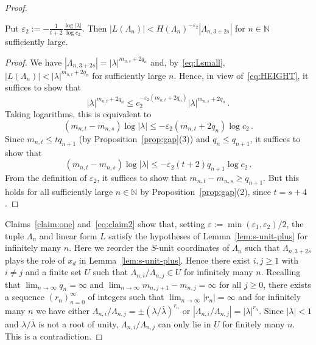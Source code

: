 \documentclass[a4paper,UKenglish,cleveref, autoref, thm-restate]{lipics-v2021}
\begin{document}
\begin{proof}
\begin{claim}
Put $\varepsilon_2:=-\frac{1}{t+2}\frac{\log|\lambda|}{\log c_2}$.  
Then $|L(\Lambda_n)| < H(\Lambda_n)^{-\varepsilon_2} |\Lambda_{n,3+2s}|$ for $n \in \mathbb N$ sufficiently large.
    \label{eq:claim2}
\end{claim}
\begin{proof}
We have $|\Lambda_{n,3+2s}|=|\lambda|^{m_{n,s}+2q_n}$ and,
by~\eqref{eq:Lsmall}, $|L(\Lambda_n)| < |\lambda|^{m_{n,t}+2q_n}$ for sufficiently large $n$.
Hence, in view of~\eqref{eq:HEIGHT}, it suffices to show that 
\[|\lambda|^{m_{n,t}+2q_n} \leq c_2^{-\varepsilon_2(m_{n,t}+2q_n)} |\lambda|^{m_{n,s}+2q_n}\, .\]
Taking logarithms, this is equivalent to 
\[
(m_{n,t}-m_{n,s}) \log |\lambda| \leq - \varepsilon_2 (m_{n,t}+2q_n) \log c_2 \, .
\]
Since $m_{n,t}\leq t q_{n+1}$ (by Proposition~\ref{prop:gap}(3)) and $q_n \leq q_{n+1}$, it suffices to show that 
\[ (m_{n,t}-m_{n,s}) \log |\lambda| \leq -\varepsilon_2 (t+2) q_{n+1} \log c_2 \, .
\]
From the definition of $\varepsilon_2$, it suffices to show that $m_{n,t}-m_{n,s} \geq q_{n+1}$.  But 
this holds for all sufficiently large $n \in \mathbb N$ by Proposition~\ref{prop:gap}(2), since $t=s+4$.
\end{proof}



Claims~\ref{claim:one} and~\ref{eq:claim2} show that, setting $\varepsilon:=\min(\varepsilon_1,\varepsilon_2)/2$,  
the tuple $\Lambda_n$ and linear form $L$ satisfy the hypotheses of Lemma~\ref{lem:s-unit-plus} for infinitely many $n$.
Here we reorder the \(S\)-unit coordinates of \(\Lambda_n\) such that  \(\Lambda_{n,3+2s}\) plays the role of \(x_d\) in Lemma~\ref{lem:s-unit-plus}.  Hence there exist $i,j\geq 1$ with 
$i\neq j$ and a finite set $U$ such that $\Lambda_{n,i}/\Lambda_{n,j} \in U$ for infinitely many $n$. 
Recalling that $\lim_{n\rightarrow\infty} q_n = \infty$ and $\lim_{n\rightarrow\infty} m_{n,j+1}-m_{n,j}=\infty$ for all $j\geq 0$, 
there exists a sequence $(r_n)_{n=0}^\infty$ of integers such that $\lim_{n\rightarrow\infty}|r_n|=\infty$
and for infinitely many $n$ we have
either $\Lambda_{n,i}/\Lambda_{n,j} = \pm (\lambda/\overline{\lambda})^{r_n}$ 
or  $|\Lambda_{n,i}/\Lambda_{n,j}|=|\lambda|^{r_n}$.
Since $|\lambda|<1$ and $\lambda/\overline{\lambda}$ is not a root of unity,
$\Lambda_{n,i}/\Lambda_{n,j}$ can only lie in $U$ for finitely many $n$.  This is a contradiction.
\end{proof}
\end{document}
